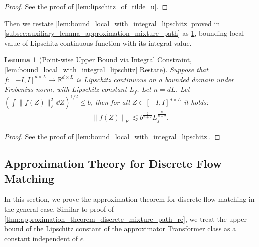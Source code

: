 \documentclass[12pt]{article}
\numberwithin{equation}{section}
\def\R{\mathbb{R}}
\theoremstyle{theoremstyle}
\newtheorem{lemma}{Lemma}[section]
\numberwithin{equation}{section}
\numberwithin{theorem}{section}
\numberwithin{proposition}{section}
\numberwithin{definition}{section}
\numberwithin{lemma}{section}
\numberwithin{assumption}{section}
\numberwithin{remark}{section}
\begin{document}
\begin{proof}
See the proof of \cref{lem:lipschitz_of_tilde_u}.
\end{proof}

Then we restate \cref{lem:bound_local_with_integral_lipschitz} proved in \cref{subsec:auxiliary_lemma_approximation_mixture_path} as \cref{lem:bound_local_with_integral_lipschitz_general_case}, bounding local value of Lipschitz continuous function with its integral value.

\begin{lemma}[Point-wise Upper Bound via Integral Constraint, \cref{lem:bound_local_with_integral_lipschitz} Restate]\label{lem:bound_local_with_integral_lipschitz_general_case}
Suppose that $f:[-I,I]^{d\times L}\to \R^{d\times L}$ is Lipschitz continuous on a bounded domain under Frobenius norm, with Lipschitz constant $L_f$.
Let $n=dL$.
Let $(\int\|f(Z)\|_F^2\dd Z)^{1/2}\leq b$, then for all $Z\in[-I,I]^{d\times L}$ it holds:
\begin{align*}
    \|f(Z)\|_F\lesssim b^\frac{2}{n+2}L_f^\frac{n}{n+2} .
\end{align*}
\end{lemma}

\begin{proof}
See the proof of \cref{lem:bound_local_with_integral_lipschitz}.
\end{proof}

\subsection{Approximation Theory for Discrete Flow Matching}\label{sec:approximation_general_main_proof}

In this section, we prove the approximation theorem for discrete flow matching in the general case.
Similar to proof of \cref{thm:approximation_theorem_discrete_mixture_path_re}, we treat the upper bound of the Lipschitz constant of the approximator Transformer class as a constant independent of $\epsilon$.
\end{document}
